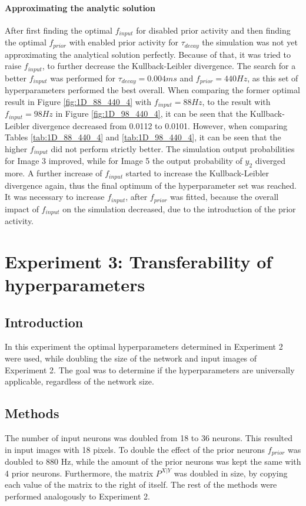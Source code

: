 \paragraph{Approximating the analytic solution}
After first finding the optimal $f_{input}$ for disabled prior activity and then finding the optimal $f_{prior}$ with enabled prior activity for $\tau_{decay}$ the simulation was not yet approximating the analytical solution perfectly. Because of that, it was tried to raise $f_{input}$, to further decrease the Kullback-Leibler divergence. The search for a better $f_{input}$ was performed for $\tau_{decay} = 0.004 ms$ and $f_{prior} = 440 Hz$, as this set of hyperparameters performed the best overall.
When comparing the former optimal result in Figure \ref{fig:1D_88_440_4} with $f_{input} = 88 Hz$, to the result with $f_{input} = 98 Hz$ in Figure \ref{fig:1D_98_440_4}, it can be seen that the Kullback-Leibler divergence decreased from 0.0112 to 0.0101. However, when comparing Tables \ref{tab:1D_88_440_4} and \ref{tab:1D_98_440_4}, it can be seen that the higher $f_{input}$ did not perform strictly better. The simulation output probabilities for Image 3 improved, while for Image 5 the output probability of $y_2$ diverged more. A further increase of $f_{input}$ started to increase the Kullback-Leibler divergence again, thus the final optimum of the hyperparameter set was reached. It was necessary to increase $f_{input}$, after $f_{prior}$ was fitted, because the overall impact of $f_{input}$ on the simulation decreased, due to the introduction of the prior activity.

\section{Experiment 3: Transferability of hyperparameters}
\label{section:1DDoubleSize}

\subsection{Introduction}
In this experiment the optimal hyperparameters determined in Experiment 2 were used, while doubling the size of the network and input images of Experiment 2. The goal was to determine if the hyperparameters are universally applicable, regardless of the network size.

\subsection{Methods}
The number of input neurons was doubled from 18 to 36 neurons. This resulted in input images with 18 pixels. To double the effect of the prior neurons $f_{prior}$ was doubled to 880 Hz, while the amount of the prior neurons was kept the same with 4 prior neurons. Furthermore, the matrix $P^{X|Y}$ was doubled in size, by copying each value of the matrix to the right of itself.  The rest of the methods were performed analogously to Experiment 2.

